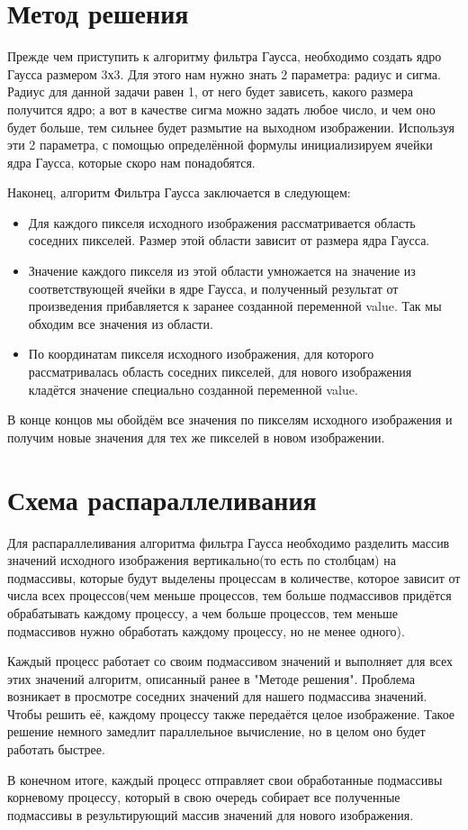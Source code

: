 \documentclass{report}
\begin{document}
\section*{Метод решения}
Прежде чем приступить к алгоритму фильтра Гаусса, необходимо создать ядро Гаусса размером 3х3. Для этого нам нужно знать 2 параметра: радиус и сигма. Радиус для данной задачи равен 1, от него будет зависеть, какого размера получится ядро; а вот в качестве сигма можно задать любое число, и чем оно будет больше, тем сильнее будет размытие на выходном изображении. Используя эти 2 параметра, с помощью определённой формулы инициализируем ячейки ядра Гаусса, которые скоро нам понадобятся.
\par Наконец, алгоритм Фильтра Гаусса заключается в следующем:
\begin{itemize}
\item Для каждого пикселя исходного изображения рассматривается область соседних пикселей. Размер этой области зависит от размера ядра Гаусса.
\item Значение каждого пикселя из этой области умножается на значение из соответствующей ячейки в ядре Гаусса, и полученный результат от произведения прибавляется к заранее созданной переменной value. Так мы обходим все значения из области.
\item По координатам пикселя исходного изображения, для которого рассматривалась область соседних пикселей, для нового изображения кладётся значение специально созданной переменной value.
\end{itemize}
\par В конце концов мы обойдём все значения по пикселям исходного изображения и получим новые значения для тех же пикселей в новом изображении.
\newpage

\section*{Схема распараллеливания}
Для распараллеливания алгоритма фильтра Гаусса необходимо разделить массив значений исходного изображения вертикально(то есть по столбцам) на подмассивы, которые будут выделены процессам в количестве, которое зависит от числа всех процессов(чем меньше процессов, тем больше подмассивов придётся обрабатывать каждому процессу, а чем больше процессов, тем меньше подмассивов нужно обработать каждому процессу, но не менее одного).
\par Каждый процесс работает со своим подмассивом значений и выполняет для всех этих значений алгоритм, описанный ранее в "Методе решения". Проблема возникает в просмотре соседних значений для нашего подмассива значений. Чтобы решить её, каждому процессу также передаётся целое изображение. Такое решение немного замедлит параллельное вычисление, но в целом оно будет работать быстрее.
\par В конечном итоге, каждый процесс отправляет свои обработанные подмассивы корневому процессу, который в свою очередь собирает все полученные подмассивы в результирующий массив значений для нового изображения.
\newpage
\end{document}

